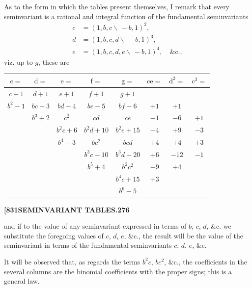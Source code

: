 \documentclass[12pt,a4paper]{article}
\theoremstyle{definition}
\begin{document}
As to the form in which the tables present themselves, I remark that every seminvariant is a rational and integral function of the fundamental seminvariants
\begin{align*}
c &= (1, b, c \!\!\!\backslash\, -b, 1)^2, \\
d &= (1, b, c, d \!\!\!\backslash\, -b, 1)^3, \\
e &= (1, b, c, d, e \!\!\!\backslash\, -b, 1)^4, \quad \&\text{c.},
\end{align*}
viz. up to $g$, these are

\begin{center}
\begin{tabular}{|c|c|c|c|c|c|c|c|}
\hline
$\mathrm{c} =$ & $\mathrm{d} =$ & $\mathrm{e} =$ & $\mathrm{f} =$ & $\mathrm{g} =$ & $\mathrm{ce} =$ & $\mathrm{d}^2 =$ & $\mathrm{c}^3 =$ \\
\hline
$c + 1$ & $d + 1$ & $e + 1$ & $f + 1$ & $g + 1$ & & & \\
$b^2 - 1$ & $bc - 3$ & $bd - 4$ & $be - 5$ & $bf - 6$ & $+1$ & $+1$ & \\
& $b^3 + 2$ & $c^2$ & $cd$ & $ce$ & $-1$ & $-6$ & $+1$ \\
& & $b^2c + 6$ & $b^2d + 10$ & $b^2e + 15$ & $-4$ & $+9$ & $-3$ \\
& & $b^4 - 3$ & $bc^2$ & $bcd$ & $+4$ & $+4$ & $+3$ \\
& & & $b^3c - 10$ & $b^3d - 20$ & $+6$ & $-12$ & $-1$ \\
& & & $b^5 + 4$ & $b^2c^2$ & $-9$ & $+4$ & \\
& & & & $b^4c + 15$ & $+3$ & & \\
& & & & $b^6 - 5$ & & & \\
\hline
\end{tabular}
\end{center}

\newpage
\setcounter{page}{276}

\noindent\textbf{[831}\hfill\textbf{SEMINVARIANT TABLES.}\hfill\textbf{276}

\bigskip

\noindent and if to the value of any seminvariant expressed in terms of $b$, $c$, $d$, \&c. we substitute the foregoing values of $c$, $d$, $e$, \&c., the result will be the value of the seminvariant in terms of the fundamental seminvariants $c$, $d$, $e$, \&c.

It will be observed that, as regards the terms $b^2c$, $bc^2$, \&c., the coefficients in the several columns are the binomial coefficients with the proper signs; this is a general law.
\end{document}
